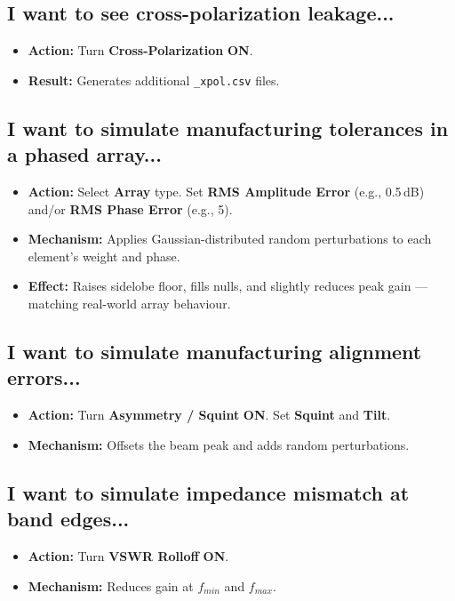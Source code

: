 \documentclass[11pt,a4paper]{article}
\begin{document}
\subsection{I want to see cross-polarization leakage...}
\begin{itemize}
    \item \textbf{Action:} Turn \textbf{Cross-Polarization} \textbf{ON}.
    \item \textbf{Result:} Generates additional \texttt{\_xpol.csv} files.
\end{itemize}

\subsection{I want to simulate manufacturing tolerances in a phased array...}
\begin{itemize}
    \item \textbf{Action:} Select \textbf{Array} type. Set \textbf{RMS Amplitude Error} (e.g., 0.5\,dB) and/or \textbf{RMS Phase Error} (e.g., 5\textdegree).
    \item \textbf{Mechanism:} Applies Gaussian-distributed random perturbations to each element's weight and phase.
    \item \textbf{Effect:} Raises sidelobe floor, fills nulls, and slightly reduces peak gain --- matching real-world array behaviour.
\end{itemize}

\subsection{I want to simulate manufacturing alignment errors...}
\begin{itemize}
    \item \textbf{Action:} Turn \textbf{Asymmetry / Squint} \textbf{ON}. Set \textbf{Squint} and \textbf{Tilt}.
    \item \textbf{Mechanism:} Offsets the beam peak and adds random perturbations.
\end{itemize}

\subsection{I want to simulate impedance mismatch at band edges...}
\begin{itemize}
    \item \textbf{Action:} Turn \textbf{VSWR Rolloff} \textbf{ON}.
    \item \textbf{Mechanism:} Reduces gain at $f_{min}$ and $f_{max}$.
\end{itemize}
\end{document}
